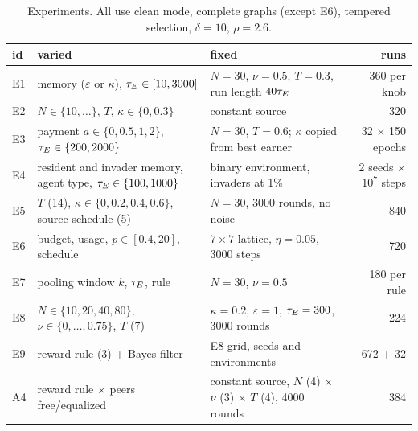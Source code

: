 \begin{table}[htbp]\centering\small
\caption{Experiments. All use clean mode, complete graphs (except E6), tempered selection, $\delta=10$, $\rho=2.6$.}
\begin{tabular}{lp{5.2cm}p{5.6cm}r}\toprule
id & varied & fixed & runs\\\midrule
E1 & memory ($\varepsilon$ or $\kappa$), $\tau_E\in[10,3000]$ & $N=30$, $\nu=0.5$, $T=0.3$, run length $40\tau_E$ & 360 per knob\\
E2 & $N\in\{10,\dots\}$, $T$, $\kappa\in\{0,0.3\}$ & constant source & 320\\
E3 & payment $a\in\{0,0.5,1,2\}$, $\tau_E\in\{200,2000\}$ & $N=30$, $T=0.6$; $\kappa$ copied from best earner & 32 $\times$ 150 epochs\\
E4 & resident and invader memory, agent type, $\tau_E\in\{100,1000\}$ & binary environment, invaders at 1\% & 2 seeds $\times$ $10^7$ steps\\
E5 & $T$ (14), $\kappa\in\{0,0.2,0.4,0.6\}$, source schedule (5) & $N=30$, 3000 rounds, no noise & 840\\
E6 & budget, usage, $p\in[0.4,20]$, schedule & $7\times7$ lattice, $\eta=0.05$, 3000 steps & 720\\
E7 & pooling window $k$, $\tau_E$, rule & $N=30$, $\nu=0.5$ & 180 per rule\\
E8 & $N\in\{10,20,40,80\}$, $\nu\in\{0,\dots,0.75\}$, $T$ (7) & $\kappa=0.2$, $\varepsilon=1$, $\tau_E=300$, 3000 rounds & 224\\
E9 & reward rule (3) + Bayes filter & E8 grid, seeds and environments & 672 + 32\\
A4 & reward rule $\times$ peers free/equalized & constant source, $N$ (4) $\times$ $\nu$ (3) $\times$ $T$ (4), 4000 rounds & 384\\\bottomrule
\end{tabular}\end{table}
